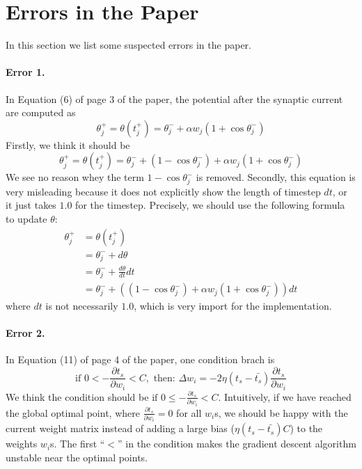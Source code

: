\section{Errors in the Paper}

In this section we list some suspected errors in the paper.

\paragraph{Error 1.}
In Equation (6) of page 3 of the paper, the potential after the synaptic current are computed as
\begin{equation}
	\theta_j^+ = \theta(t_j^+) = \theta_j^- + \alpha w_j (1+\cos \theta_j^-)
\end{equation}
Firstly, we think it should be 
\begin{equation}
	\theta_j^+ = \theta(t_j^+) = \theta_j^- + (1-\cos \theta_j^-) + \alpha w_j (1+\cos \theta_j^-)
\end{equation}
We see no reason whey the term $ 1-\cos \theta_j^-$ is removed.
Secondly, this equation is very misleading because it does not explicitly show the length of timestep $dt$,
or it just takes $1.0$ for the timestep.
Precisely, we should use the following formula to update $\theta$:
\begin{align}
	\theta_j^+ &= \theta(t_j^+) \\
	&= \theta_j^- + d\theta \\
	&= \theta_j^- + \frac{d\theta}{dt} dt\\
	&= \theta_j^- + ((1-\cos \theta_j^-) + \alpha w_j (1+\cos \theta_j^-))dt
\end{align}
where $dt$ is not necessarily $1.0$, which is very import for the implementation.


\paragraph{Error 2.} 
In Equation (11) of page 4 of the paper, one condition brach is
\begin{equation}
	\textrm{if } 0 < -\frac{\partial t_s}{\partial w_i} < C,
	\textrm{ then: } \Delta w_i = -2\eta(t_s - \bar{t_s}) \frac{\partial t_s}{\partial w_i}
\end{equation}
We think the condition should be $\textrm{if } 0 \leq -\frac{\partial t_s}{\partial w_i} < C$.
Intuitively, if we have reached the global optimal point, where $\frac{\partial t_s}{\partial w_i} = 0$ for all $w_i$s,
we should be happy with the current weight matrix
instead of adding a large bias ($\eta(t_s - \bar{t_s}) C$) to the weights $w_i$s.
The first ``$<$'' in the condition makes the gradient descent algorithm unstable near the optimal points.

